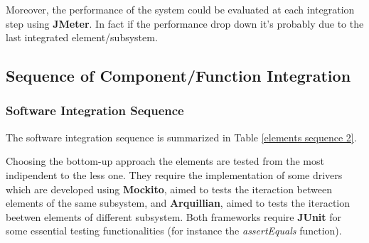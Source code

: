 Moreover, the performance of the system could be evaluated at each integration step using \textbf{JMeter}. In fact if the performance drop down it's probably due to the last integrated element/subsystem.

\subsection{Sequence of Component/Function Integration}

\subsubsection{Software Integration Sequence} \label{software integration}

The software integration sequence is summarized in Table \ref{elements sequence 2}.

Choosing the bottom-up approach the elements are tested from the most indipendent to the less one. They require the implementation of some drivers which are developed using \textbf{Mockito}, aimed to tests the iteraction between elements of the same subsystem, and \textbf{Arquillian}, aimed to tests the iteraction beetwen elements of different subsystem. Both frameworks require \textbf{JUnit} for some essential testing functionalities (for instance the \textit{assertEquals} function).

